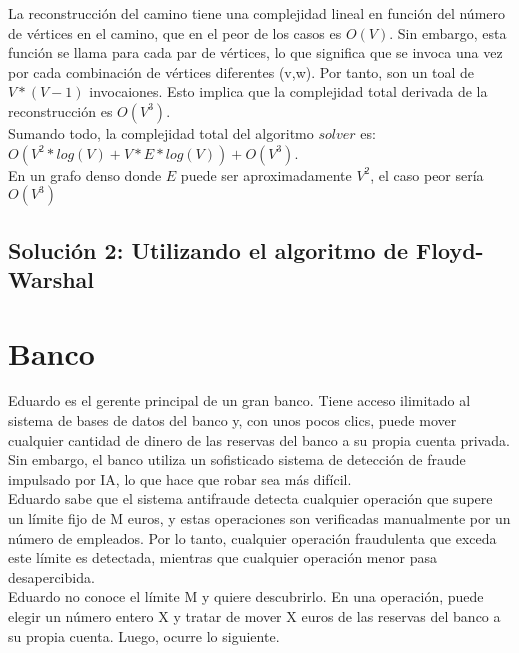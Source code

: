 \documentclass[
10pt, %
a4paper, %
oneside, %
headinclude,footinclude, %
BCOR5mm, %
]{scrartcl}
\begin{document}
La reconstrucción del camino tiene una complejidad lineal en función del número de vértices en el camino, que en el peor 
de los casos es $O(V)$. Sin embargo, esta función se llama para cada par de vértices, lo que significa que se invoca una vez por cada 
combinación de vértices diferentes (v,w). Por tanto, son un toal de $V*(V-1)$ invocaiones. Esto implica que la complejidad total derivada de la 
reconstrucción es $O(V^3)$. \\

Sumando todo, la complejidad total del algoritmo $solver$ es: $O(V^2 * log(V) + V * E*log(V) ) + O(V^3)$. \\

En un grafo denso donde $E$ puede ser aproximadamente $V^2$, el caso peor sería $O(V^3)$


\subsection{Solución 2: Utilizando el algoritmo de Floyd-Warshal}




 

\section{Banco}

Eduardo es el gerente principal de un gran banco. Tiene acceso ilimitado al sistema de bases de datos del banco y, con unos pocos clics, puede mover cualquier cantidad de dinero de las reservas del banco a su propia cuenta privada. Sin embargo, el banco utiliza un sofisticado sistema de detección de fraude impulsado por IA, lo que hace que robar sea más difícil. \\

Eduardo sabe que el sistema antifraude detecta cualquier operación que supere un límite fijo de M euros, y estas operaciones son verificadas manualmente por un número de empleados. Por lo tanto, cualquier operación fraudulenta que exceda este límite es detectada, mientras que cualquier operación menor pasa desapercibida.\\

Eduardo no conoce el límite M y quiere descubrirlo. En una operación, puede elegir un número entero X y tratar de mover X euros de las reservas del banco a su propia cuenta. Luego, ocurre lo siguiente.\\
\end{document}
